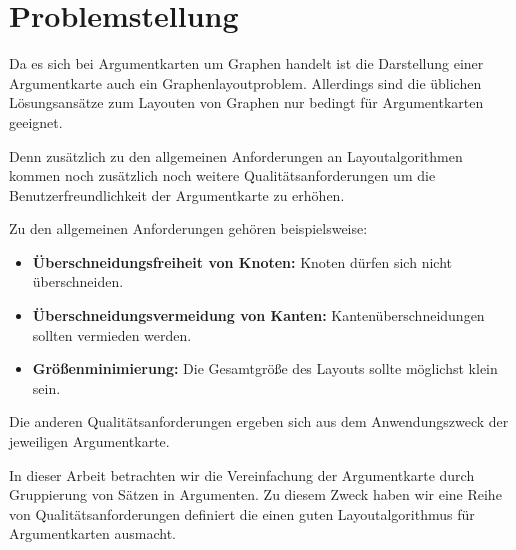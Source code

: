 

\chapter{Problemstellung}
Da es sich bei Argumentkarten um Graphen handelt ist die Darstellung einer Argumentkarte auch ein Graphenlayoutproblem. Allerdings sind die üblichen Lösungsansätze zum Layouten von Graphen nur bedingt für Argumentkarten geeignet.

Denn zusätzlich zu den allgemeinen Anforderungen an Layoutalgorithmen kommen noch zusätzlich noch weitere Qualitätsanforderungen um die Benutzerfreundlichkeit der Argumentkarte zu erhöhen.

Zu den allgemeinen Anforderungen gehören beispielsweise:

\begin{itemize}
\item {\bf{Überschneidungsfreiheit von Knoten:}} \newline Knoten dürfen sich nicht überschneiden.
\item {\bf{Überschneidungsvermeidung von Kanten:}}  \newline Kantenüberschneidungen sollten vermieden werden.
\item {\bf{Größenminimierung:}} \newline Die Gesamtgröße des Layouts sollte möglichst klein sein.
\end{itemize}

Die anderen Qualitätsanforderungen ergeben sich aus dem Anwendungszweck der jeweiligen Argumentkarte.

In dieser Arbeit betrachten wir die Vereinfachung der Argumentkarte durch Gruppierung von Sätzen in Argumenten. Zu diesem Zweck haben wir eine Reihe von Qualitätsanforderungen definiert die einen guten Layoutalgorithmus für Argumentkarten ausmacht.


